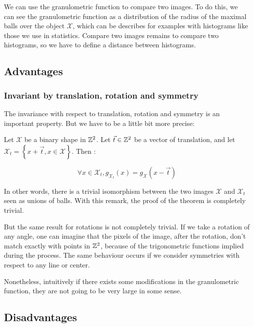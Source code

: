 We can use the granulometric function to compare two images. To do this, we can see the granulometric function as a distribution of the radius of the maximal balls over the object $\mathcal{X}$, which can be describes for examples with histograms like those we use in statistics. Compare two images remains to compare two histograms, so we have to define a distance between histograms.

\subsection{Advantages}

\subsubsection{Invariant by translation, rotation and symmetry}

The invariance with respect to translation, rotation and symmetry is an important property. But we have to be a little bit more precise:

\begin{theo}
	Let $\mathcal{X}$ be a binary shape in $\mathbb{Z}^{2}$. Let $\vec{t} \in \mathbb{Z}^{2}$ be a vector of translation, and let $\mathcal{X}_{t} = \left\{ x + \vec{t}, x \in \mathcal{X} \right\}$. Then :
	
	$$ \forall x \in \mathcal{X}_{t}, g_{\mathcal{X}_{t}}(x) = g_{\mathcal{X}}(x-\vec{t}) $$
\end{theo}

In other words, there is a trivial isomorphism between the two images $\mathcal{X}$ and  $\mathcal{X}_t$ seen as unions of balls. With this remark, the proof of the theorem is completely trivial.

But the same result for rotations is not completely trivial. If we take a rotation of any angle, one can imagine that the pixels of the image, after the rotation, don't match exactly with points in $\mathbb{Z}^{2}$, because of the trigonometric functions implied during the process. The same behaviour occurs if we consider symmetries with respect to any line or center.

Nonetheless, intuitively if there exists some modifications in the granulometric function, they are not going to be very large in some sense.


\subsection{Disadvantages}

